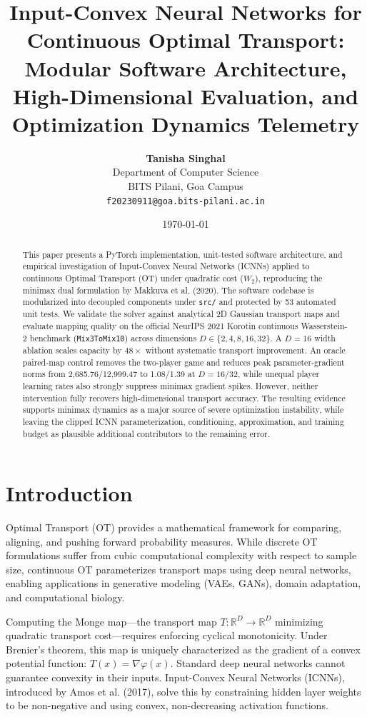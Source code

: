 \documentclass[11pt,a4paper]{article}
\title{\Large \textbf{Input-Convex Neural Networks for Continuous Optimal Transport:\\ Modular Software Architecture, High-Dimensional Evaluation, and Optimization Dynamics Telemetry}}
\author{\textbf{Tanisha Singhal} \\
Department of Computer Science \\
BITS Pilani, Goa Campus \\
\texttt{f20230911@goa.bits-pilani.ac.in}}
\date{\today}
\begin{document}
\maketitle

\begin{abstract}
This paper presents a PyTorch implementation, unit-tested software architecture, and empirical investigation of Input-Convex Neural Networks (ICNNs) applied to continuous Optimal Transport (OT) under quadratic cost ($W_2$), reproducing the minimax dual formulation by Makkuva et al. (2020). The software codebase is modularized into decoupled components under \texttt{src/} and protected by 53 automated unit tests. We validate the solver against analytical 2D Gaussian transport maps and evaluate mapping quality on the official NeurIPS 2021 Korotin continuous Wasserstein-2 benchmark (\texttt{Mix3ToMix10}) across dimensions $D \in \{2, 4, 8, 16, 32\}$. A $D=16$ width ablation scales capacity by $48\times$ without systematic transport improvement. An oracle paired-map control removes the two-player game and reduces peak parameter-gradient norms from 2,685.76/12,999.47 to 1.08/1.39 at $D=16/32$, while unequal player learning rates also strongly suppress minimax gradient spikes. However, neither intervention fully recovers high-dimensional transport accuracy. The resulting evidence supports minimax dynamics as a major source of severe optimization instability, while leaving the clipped ICNN parameterization, conditioning, approximation, and training budget as plausible additional contributors to the remaining error.
\end{abstract}

\section{Introduction}
Optimal Transport (OT) provides a mathematical framework for comparing, aligning, and pushing forward probability measures. While discrete OT formulations suffer from cubic computational complexity with respect to sample size, continuous OT parameterizes transport maps using deep neural networks, enabling applications in generative modeling (VAEs, GANs), domain adaptation, and computational biology.

Computing the Monge map---the transport map $T: \mathbb{R}^D \to \mathbb{R}^D$ minimizing quadratic transport cost---requires enforcing cyclical monotonicity. Under Brenier's theorem, this map is uniquely characterized as the gradient of a convex potential function: $T(x) = \nabla \varphi(x)$. Standard deep neural networks cannot guarantee convexity in their inputs. Input-Convex Neural Networks (ICNNs), introduced by Amos et al. (2017), solve this by constraining hidden layer weights to be non-negative and using convex, non-decreasing activation functions.
\end{document}
